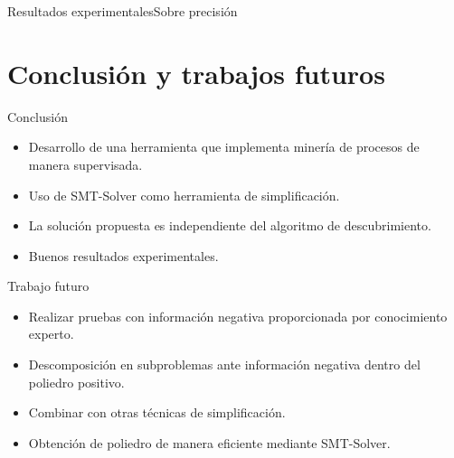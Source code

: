 \documentclass[spanish,pdf]{beamer}
\begin{document}
\begin{frame}[fragile]{Resultados experimentales}{Sobre precisión}
  \scriptsize
  
\end{frame}

%  

\section{Conclusión y trabajos futuros}
\begin{frame}{Conclusión}{}
\begin{itemize}
  \item Desarrollo de una herramienta que implementa minería de procesos de manera supervisada.

  \item Uso de SMT-Solver como herramienta de simplificación.

  \item La solución propuesta es independiente del algoritmo de descubrimiento.

  \item Buenos resultados experimentales.
\end{itemize}    
\end{frame}

\begin{frame}{Trabajo futuro}{}
\begin{itemize}
  \item Realizar pruebas con información negativa proporcionada por conocimiento experto.

  \item Descomposición en subproblemas ante información negativa dentro del poliedro positivo.

  \item Combinar con otras técnicas de simplificación.

  \item Obtención de poliedro de manera eficiente mediante SMT-Solver.
\end{itemize}                         
\end{frame}
\end{document}
